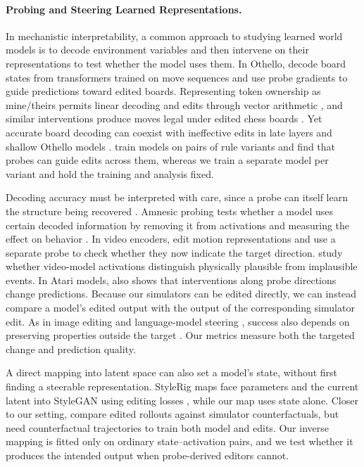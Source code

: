 \documentclass{article} %
\begin{document}
\paragraph{Probing and Steering Learned Representations.}
In mechanistic interpretability, a common approach to studying learned world models is to decode environment variables and then intervene on their representations to test whether the model uses them. In Othello, \citet{li2023othello} decode board states from transformers trained on move sequences and use probe gradients to guide predictions toward edited boards. Representing token ownership as mine/theirs permits linear decoding and edits through vector arithmetic \citep{nanda2023linear}, and similar interventions produce moves legal under edited chess boards \citep{karvonen2024chess}. Yet accurate board decoding can coexist with ineffective edits in late layers and shallow Othello models \citep{hazineh2023linear}. \citet{chawla2026metaothello} train models on pairs of rule variants and find that probes can guide edits across them, whereas we train a separate model per variant and hold the training and analysis fixed.

Decoding accuracy must be interpreted with care, since a probe can itself learn the structure being recovered \citep{hewitt2019probes}. Amnesic probing tests whether a model uses certain decoded information by removing it from activations and measuring the effect on behavior \citep{elazar2021amnesic}. In video encoders, \citet{joseph2026physics} edit motion representations and use a separate probe to check whether they now indicate the target direction. \citet{esmati2026invisible} study whether video-model activations distinguish physically plausible from implausible events. In Atari models, \citet{zhang2026probing} also shows that interventions along probe directions change predictions. Because our simulators can be edited directly, we can instead compare a model's edited output with the output of the corresponding simulator edit. As in image editing \citep{shen2020interfacegan} and language-model steering \citep{zou2023repe,rimsky2024caa}, success also depends on preserving properties outside the target \citep{canby2025reliable}. Our metrics measure both the targeted change and prediction quality.

A direct mapping into latent space can also set a model's state, without first finding a steerable representation. StyleRig maps face parameters and the current latent into StyleGAN using editing losses \citep{tewari2020stylerig}, while our map uses state alone. Closer to our setting, \citet{liu2026carriers} compare edited rollouts against simulator counterfactuals, but need counterfactual trajectories to train both model and edits. Our inverse mapping is fitted only on ordinary state--activation pairs, and we test whether it produces the intended output when probe-derived editors cannot.
\end{document}
